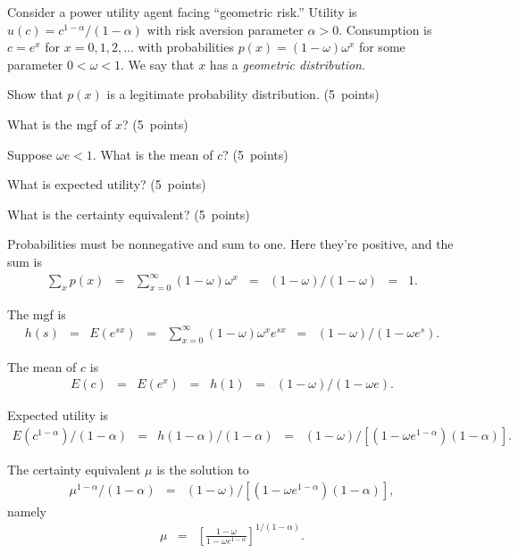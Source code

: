 \documentclass[11pt]{exam}
\begin{document}
\begin{questions}
Consider a power utility agent facing ``geometric risk.''
Utility is $u(c) = c^{1-\alpha}/(1-\alpha) $ with risk aversion
parameter $\alpha > 0$.
Consumption is $ c = e^x$
for $ x = 0,1,2, \ldots$ with probabilities
$ p(x) = (1-\omega) \omega^x$ for some parameter $0< \omega < 1$.
We say that $x$ has a {\it geometric distribution\/}.
%
\begin{parts}
\item Show that $p(x)$ is a legitimate probability distribution.
(5~points)
\item What is the mgf of $x$?
(5~points)
\item Suppose $\omega e < 1$.  What is the mean of $c$?
(5~points)
\item What is expected utility?
(5~points)
\item What is the certainty equivalent?
(5~points)
\end{parts}

\begin{solution}
\begin{parts}
\item Probabilities must be nonnegative and sum to one.
Here they're positive, and the sum is
\begin{eqnarray*}
    \sum_x p(x) &=& \sum_{x=0}^\infty (1-\omega) \omega^x
        \;\;=\;\; (1-\omega) / (1-\omega) \;\;=\;\; 1.
\end{eqnarray*}

\item The mgf is
\begin{eqnarray*}
    h(s) &=& E (e^{sx}) \;\;=\;\;
            \sum_{x=0}^\infty (1-\omega) \omega^x e^{sx}
            \;\;=\;\; (1-\omega) / ( 1 - \omega e^s) .
\end{eqnarray*}

\item The mean of $c$ is
\begin{eqnarray*}
    E(c) &=& E (e^{x}) \;\;=\;\; h(1)
            \;\;=\;\; (1-\omega) / ( 1 - \omega e) .
\end{eqnarray*}

\item Expected utility is
\begin{eqnarray*}
    E(c^{1-\alpha})/(1-\alpha) &=&  h(1-\alpha)/(1-\alpha)
            \;\;=\;\; (1-\omega) / [( 1 - \omega e^{1-\alpha})(1-\alpha)] .
\end{eqnarray*}
\item The certainty equivalent $\mu$ is the solution to
\begin{eqnarray*}
    \mu^{1-\alpha}/(1-\alpha) &=&  (1-\omega) / [( 1 - \omega e^{1-\alpha})(1-\alpha)] ,
\end{eqnarray*}
namely
\begin{eqnarray*}
    \mu &=&  \left[
                \frac{ 1-\omega} { 1 - \omega e^{1-\alpha} }
             \right]^{1/(1-\alpha)} .
\end{eqnarray*}
\end{parts}
\end{solution}


\end{questions}
\end{document}
